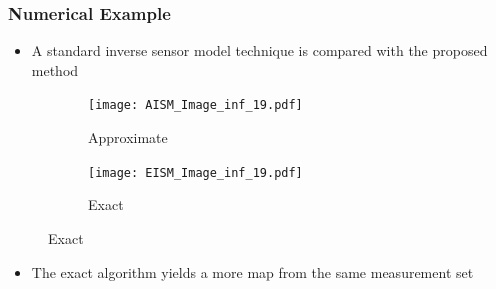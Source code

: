 \documentclass[11pt,professionalfonts,hyperref={pdftex,pdfpagemode=none,pdfstartview=FitH}]{beamer}
\renewcommand{\emph}[1]{\textit{\textbf{\color{blue}{#1}}}}
\begin{document}
\begin{frame}
\frametitle{Numerical Example}

\begin{minipage}[t]{5.0cm}
\vspace*{0.5cm}
\begin{itemize}
	\item A standard \emph{approximate} inverse sensor model technique is compared with the proposed \emph{exact} method
\end{itemize}
\end{minipage}
\begin{minipage}[t]{5.0cm}
\begin{figure}[!htbp]
    \centering
    \begin{subfigure}{0.5\textwidth}
        \centering
        \texttt{[image: AISM\_Image\_inf\_19.pdf]}
        \caption*{Approximate}
    \end{subfigure}
    \hspace*{-0.1\textwidth}
    \begin{subfigure}{0.5\textwidth}
        \centering
        \texttt{[image: EISM\_Image\_inf\_19.pdf]}
        \caption*{Exact}
    \end{subfigure}
\end{figure}
\end{minipage}


\begin{itemize}
\item The exact algorithm yields a more \emph{certain} map from the same measurement set
\end{itemize}

\end{frame}


\section*{}
\end{document}
